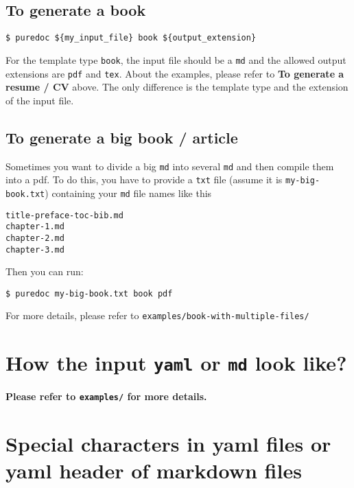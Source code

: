 \documentclass[10pt, a4paper, oneside]{article}
\begin{document}
\subsection{To generate a book}\label{to-generate-a-book}

\begin{verbatim}
$ puredoc ${my_input_file} book ${output_extension}
\end{verbatim}

For the template type \texttt{book},
the input file should be a \texttt{md} and
the allowed output extensions are \texttt{pdf} and \texttt{tex}.
About the examples, please refer to \textbf{To generate a resume / CV} above.
The only difference is the template type and the extension of the input file.

\subsection{To generate a big book / article}\label{to-generate-a-big-book-article}

Sometimes you want to divide a big \texttt{md} into several \texttt{md} and then compile them into a pdf.
To do this, you have to provide a \texttt{txt} file (assume it is \texttt{my-big-book.txt}) containing your \texttt{md} file names like this

\begin{verbatim}
title-preface-toc-bib.md
chapter-1.md
chapter-2.md
chapter-3.md
\end{verbatim}

Then you can run:

\begin{verbatim}
$ puredoc my-big-book.txt book pdf
\end{verbatim}

For more details, please refer to \texttt{examples/book-with-multiple-files/}

\section{\texorpdfstring{How the input \texttt{yaml} or \texttt{md} look like?}{How the input yaml or md look like?}}\label{how-the-input-yaml-or-md-look-like}

\textbf{Please refer to \texttt{examples/} for more details.}

\section{Special characters in yaml files or yaml header of markdown files}\label{special-characters-in-yaml-files-or-yaml-header-of-markdown-files}
\end{document}
